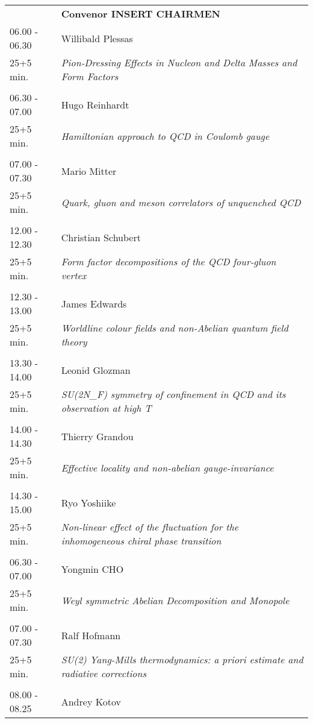 \begin{longtable}{p{3cm}p{13cm}}
&\hfill {\bf Convenor INSERT CHAIRMEN }\\ 
06.00 - 06.30 & Willibald Plessas\\ 
25+5 min. & {\it Pion-Dressing Effects in Nucleon and Delta Masses and Form Factors}\\ 
 & \\ 
06.30 - 07.00 & Hugo Reinhardt\\ 
25+5 min. & {\it Hamiltonian approach to QCD in Coulomb gauge}\\ 
 & \\ 
07.00 - 07.30 & Mario Mitter\\ 
25+5 min. & {\it Quark, gluon and meson correlators of unquenched QCD}\\ 
 & \\ 
12.00 - 12.30 & Christian Schubert\\ 
25+5 min. & {\it Form factor decompositions of the QCD four-gluon vertex}\\ 
 & \\ 
12.30 - 13.00 & James Edwards\\ 
25+5 min. & {\it Worldline colour fields and non-Abelian quantum field theory}\\ 
 & \\ 
13.30 - 14.00 & Leonid Glozman\\ 
25+5 min. & {\it SU(2N\_F) symmetry of confinement in QCD and its observation at high T}\\ 
 & \\ 
14.00 - 14.30 & Thierry Grandou\\ 
25+5 min. & {\it Effective locality and non-abelian gauge-invariance}\\ 
 & \\ 
14.30 - 15.00 & Ryo Yoshiike\\ 
25+5 min. & {\it Non-linear effect of the fluctuation for the inhomogeneous chiral phase transition}\\ 
 & \\ 
06.30 - 07.00 & Yongmin CHO\\ 
25+5 min. & {\it Weyl symmetric Abelian Decomposition and Monopole}\\ 
 & \\ 
07.00 - 07.30 & Ralf Hofmann\\ 
25+5 min. & {\it SU(2) Yang-Mills thermodynamics: a priori estimate and radiative corrections}\\ 
 & \\ 
08.00 - 08.25 & Andrey Kotov\\ 

\end{longtable}
